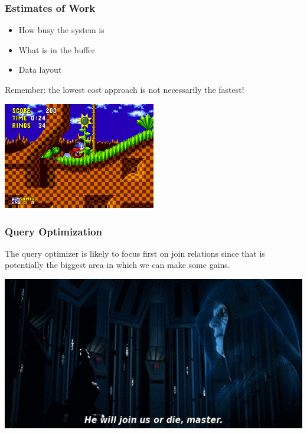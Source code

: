 \begin{frame}
\frametitle{Estimates of Work}

\begin{itemize}
	\item How busy the system is
	\item What is in the buffer
	\item Data layout
\end{itemize}


Remember: the lowest cost approach is not necessarily the fastest!

\begin{center}
	\includegraphics[width=0.5\textwidth]{images/greenhillszone.png}
\end{center}

\end{frame}


\begin{frame}
\frametitle{Query Optimization}


The query optimizer is likely to focus first on join relations since that is potentially the biggest area in which we can make some gains.

\begin{center}
	\includegraphics[width=\textwidth]{images/joinus.jpg}
\end{center}

\end{frame}

